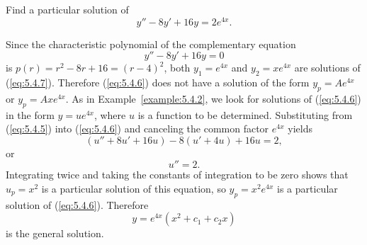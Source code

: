 \setcounter{example}{2}
\setcounter{equation}{5}
\begin{example}
  \label{example:5.4.3} \rm Find a particular solution of
  \begin{equation}
    \label{eq:5.4.6}y''-8y'+16y=2e^{4x}.
  \end{equation}
\end{example}
\setcounter{equation}{6}
\begin{examplesolution}
\solution Since the characteristic polynomial of the complementary equation
\begin{equation}
  \label{eq:5.4.7}y''-8y'+16y=0
\end{equation}
is $p(r)=r^{2}-8r+16=(r-4)^{2}$, both $y_{1}=e^{4x}$ and $y_{2}=xe^{4x}$ are solutions of
(\ref{eq:5.4.7}). Therefore (\ref{eq:5.4.6}) does not have a solution of the form $y_{p}=Ae^{4x}$ or
$y_{p}=Axe^{4x}$. As in Example~\ref{example:5.4.2}, we look for solutions of (\ref{eq:5.4.6}) in
the form $y=ue^{4x}$, where $u$ is a function to be determined. Substituting from (\ref{eq:5.4.5})
into (\ref{eq:5.4.6}) and canceling the common factor $e^{4x}$ yields
\[
  (u''+8u'+16u)-8(u'+4u)+16u=2,
\]
or
\[
  u''=2.
\]
Integrating twice and taking the constants of integration to be zero shows that $u_{p}=x^{2}$ is a
particular solution of this equation, so $y_{p}=x^{2}e^{4x}$ is a particular solution of
(\ref{eq:5.4.6}). Therefore
\[
  y=e^{4x}(x^{2}+c_{1}+c_{2}x)
\]
is the general solution. \bbox
\end{examplesolution}

